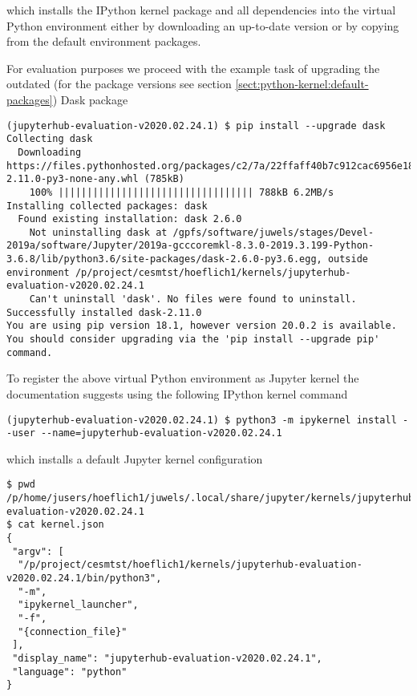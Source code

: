 \documentclass[11pt,a4paper]{article}
\begin{document}
which installs the IPython kernel package and all dependencies into the virtual Python environment either by downloading an up-to-date version or by copying from the default environment packages.

For evaluation purposes we proceed with the example task of upgrading the outdated (for the package versions see section \ref{sect:python-kernel:default-packages}) Dask package

\begin{verbatim}
(jupyterhub-evaluation-v2020.02.24.1) $ pip install --upgrade dask
Collecting dask
  Downloading https://files.pythonhosted.org/packages/c2/7a/22ffaff40b7c912cac6956e18d38c686b6b5756179e9c09e8e6bf7810aad/dask-2.11.0-py3-none-any.whl (785kB)
    100% |||||||||||||||||||||||||||||||||| 788kB 6.2MB/s
Installing collected packages: dask
  Found existing installation: dask 2.6.0
    Not uninstalling dask at /gpfs/software/juwels/stages/Devel-2019a/software/Jupyter/2019a-gcccoremkl-8.3.0-2019.3.199-Python-3.6.8/lib/python3.6/site-packages/dask-2.6.0-py3.6.egg, outside environment /p/project/cesmtst/hoeflich1/kernels/jupyterhub-evaluation-v2020.02.24.1
    Can't uninstall 'dask'. No files were found to uninstall.
Successfully installed dask-2.11.0
You are using pip version 18.1, however version 20.0.2 is available.
You should consider upgrading via the 'pip install --upgrade pip' command.
\end{verbatim}

To register the above virtual Python environment as Jupyter kernel the documentation suggests using the following IPython kernel command

\begin{verbatim}
(jupyterhub-evaluation-v2020.02.24.1) $ python3 -m ipykernel install --user --name=jupyterhub-evaluation-v2020.02.24.1
\end{verbatim}

which installs a default Jupyter kernel configuration

\begin{verbatim}
$ pwd
/p/home/jusers/hoeflich1/juwels/.local/share/jupyter/kernels/jupyterhub-evaluation-v2020.02.24.1
$ cat kernel.json
{
 "argv": [
  "/p/project/cesmtst/hoeflich1/kernels/jupyterhub-evaluation-v2020.02.24.1/bin/python3",
  "-m",
  "ipykernel_launcher",
  "-f",
  "{connection_file}"
 ],
 "display_name": "jupyterhub-evaluation-v2020.02.24.1",
 "language": "python"
}
\end{verbatim}
\end{document}
